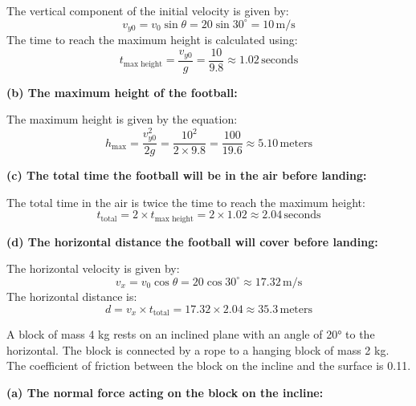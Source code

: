 \documentclass[addpoints]{exam}
\begin{document}
\begin{questions}
\begin{solution}[5cm]
The vertical component of the initial velocity is given by:
\[
v_{y0} = v_0 \sin \theta = 20 \sin 30^\circ = 10 \, \text{m/s}
\]
The time to reach the maximum height is calculated using:
\[
t_{\text{max height}} = \frac{v_{y0}}{g} = \frac{10}{9.8} \approx 1.02 \, \text{seconds}
\]

\textbf{(b) The maximum height of the football:}

The maximum height is given by the equation:
\[
h_{\text{max}} = \frac{v_{y0}^2}{2g} = \frac{10^2}{2 \times 9.8} = \frac{100}{19.6} \approx 5.10 \, \text{meters}
\]

\textbf{(c) The total time the football will be in the air before landing:}

The total time in the air is twice the time to reach the maximum height:
\[
t_{\text{total}} = 2 \times t_{\text{max height}} = 2 \times 1.02 \approx 2.04 \, \text{seconds}
\]

\textbf{(d) The horizontal distance the football will cover before landing:}

The horizontal velocity is given by:
\[
v_{x} = v_0 \cos \theta = 20 \cos 30^\circ \approx 17.32 \, \text{m/s}
\]
The horizontal distance is:
\[
d = v_{x} \times t_{\text{total}} = 17.32 \times 2.04 \approx 35.3 \, \text{meters}
\]
\end{solution}



\question A block of mass 4 kg rests on an inclined plane with an angle of 20° to the horizontal. The block is connected by a rope to a hanging block of mass 2 kg. The coefficient of friction between the block on the incline and the surface is 0.11.
\begin{solution}[5cm]
\textbf{(a) The normal force acting on the block on the incline:}


\end{solution}
\end{questions}
\end{document}
